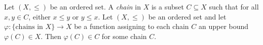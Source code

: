  Let $(X, \leq)$ be an ordered set. A \textit{chain} in $X$ is a subset $C \subseteq X$ such that for all $x, y \in C$, either $x \leq y$ or $y \leq x$.
 Let $(X, \leq)$ be an ordered set and let $\varphi \colon \{ \text{chains in } X \} \to X$ be a function assigning to each chain $C$ an upper bound $\varphi(C) \in X$. Then $\varphi(C) \in C$ for some chain $C$.
